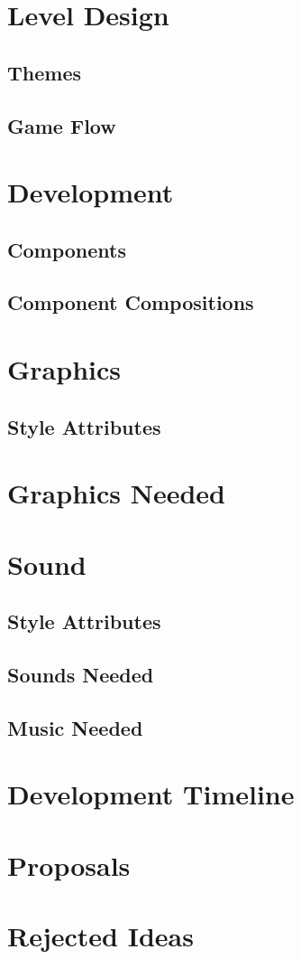 \documentclass[letterpaper, twoside, 12pt]{memoir}
\begin{document}
\chapter{Level Design}
\section{Themes}
\section{Game Flow}

\chapter{Development}
\section{Components}
\section{Component Compositions}

\chapter{Graphics}
\section{Style Attributes}
\chapter{Graphics Needed}

\chapter{Sound}
\section{Style Attributes}
\section{Sounds Needed}
\section{Music Needed}

\chapter{Development Timeline}

\chapter{Proposals}

\chapter{Rejected Ideas}
\end{document}
